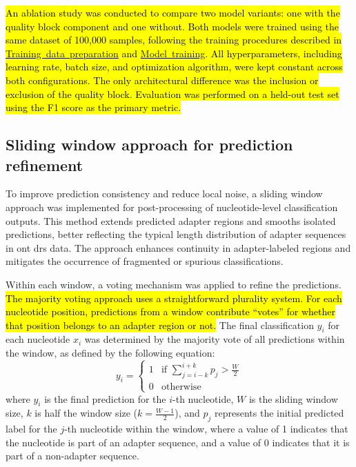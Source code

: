 \documentclass[pdflatex,sn-nature, lineno]{sn-jnl}%
\begin{document}
\hl{An ablation study was conducted to compare two model variants: one with the quality block component and one without. Both models were trained using the same dataset of 100,000 samples, following the training procedures described in \mbox{\hyperref[ssec:data]{Training data preparation}} and \mbox{\hyperref[ssec:training]{Model training}}. 
All hyperparameters, including learning rate, batch size, and optimization algorithm, were kept constant across both configurations. The only architectural difference was the inclusion or exclusion of the quality block.
Evaluation was performed on a held-out test set using the F1 score as the primary metric.}

\subsection{Sliding window approach for prediction refinement}

To improve prediction consistency and reduce local noise, a sliding window approach was implemented for post-processing of nucleotide-level classification outputs.
This method extends predicted adapter regions and smooths isolated predictions, better reflecting the typical length distribution of adapter sequences in \gls{ont} \gls{drs} data.
The approach enhances continuity in adapter-labeled regions and mitigates the occurrence of fragmented or spurious classifications.

Within each window, a voting mechanism was applied to refine the predictions.
\hl{The majority voting approach uses a straightforward plurality system.
	For each nucleotide position, predictions from a window contribute ``votes'' for whether that position belongs to an adapter region or not.}
The final classification $y_i$ for each nucleotide \( x_i \) was determined by the majority vote of all predictions within the window, as defined by the following equation:
\[
	y_i = \begin{cases}
		1 & \text{if } \sum_{j=i-k}^{i+k} p_j > \frac{W}{2} \\
		0 & \text{otherwise}
	\end{cases}
\]
where \(y_i\) is the final prediction for the $i$-th nucleotide, \( W \) is the sliding window size, \( k \) is half the window size (\( k = \frac{W-1}{2}\)), and  \(p_j\) represents the initial predicted label for the \(j\)-th nucleotide within the window, where a value of 1 indicates that the nucleotide is part of an adapter sequence, and a value of 0 indicates that it is part of a non-adapter sequence.
\end{document}
